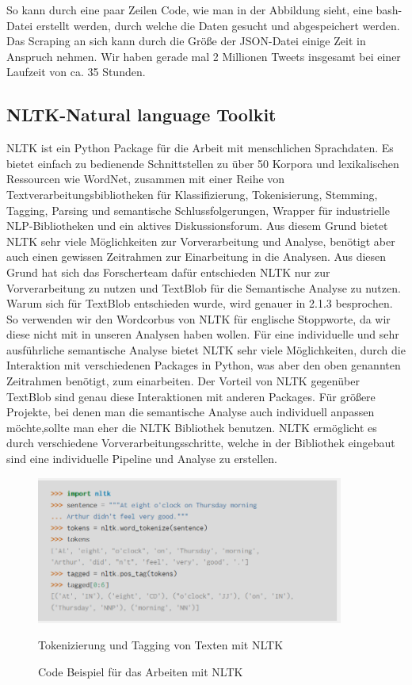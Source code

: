 	So kann durch eine paar Zeilen Code, wie man in der Abbildung \label{CodeBeispiel} sieht, eine bash-Datei erstellt werden, durch welche die Daten gesucht 
	und abgespeichert werden. Das Scraping an sich kann durch die Größe der JSON-Datei einige Zeit in Anspruch nehmen. Wir haben gerade mal 2 Millionen Tweets 
	insgesamt bei einer Laufzeit von ca. 35 Stunden.  
	

	\subsection{NLTK-Natural language Toolkit}
	
	NLTK ist ein Python Package für die Arbeit mit menschlichen Sprachdaten. Es bietet einfach zu bedienende Schnittstellen zu über 50 Korpora
	und lexikalischen Ressourcen wie WordNet, zusammen mit einer Reihe von Textverarbeitungsbibliotheken für Klassifizierung, Tokenisierung, 
	Stemming, Tagging, Parsing und semantische Schlussfolgerungen, Wrapper für industrielle NLP-Bibliotheken und ein aktives Diskussionsforum. 
	Aus diesem Grund bietet NLTK sehr viele Möglichkeiten zur Vorverarbeitung und Analyse, benötigt aber auch einen gewissen Zeitrahmen zur 
	Einarbeitung in die Analysen. Aus diesen Grund hat sich das Forscherteam dafür entschieden NLTK nur zur Vorverarbeitung zu nutzen und TextBlob
	für die Semantische Analyse zu nutzen. Warum sich für TextBlob entschieden wurde, wird genauer in 2.1.3 besprochen. So verwenden wir den Wordcorbus
	von NLTK für englische Stoppworte, da wir diese nicht mit in unseren Analysen haben wollen. Für eine individuelle und sehr ausführliche semantische Analyse 
	bietet NLTK sehr viele Möglichkeiten, durch die Interaktion mit verschiedenen Packages in Python, was aber den oben genannten Zeitrahmen benötigt, zum 
	einarbeiten. Der Vorteil von NLTK gegenüber TextBlob sind genau diese Interaktionen mit anderen Packages. Für größere Projekte, bei denen man die 
	semantische Analyse auch individuell anpassen möchte,sollte man eher die NLTK Bibliothek benutzen. NLTK ermöglicht es durch verschiedene 
	Vorverarbeitungsschritte, welche in der Bibliothek eingebaut sind eine individuelle Pipeline und Analyse zu erstellen.
	
	\begin{figure}[ht]
		\centering
		\includegraphics[width=0.9\textwidth]{images/Kapitel2/Code_Beispiel_2}
			\caption{\label{fig:CodeBeispiel}Code Beispiel für das Arbeiten mit NLTK}{Tokenizierung und Tagging von Texten mit NLTK}
	\end{figure}    	
		
